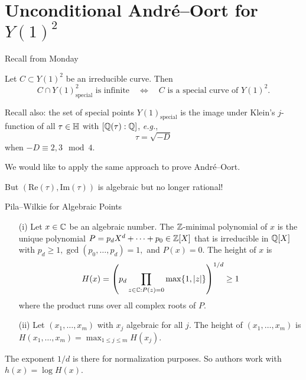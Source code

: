 \documentclass{beamer}
\begin{document}
\section{Unconditional Andr\'e--Oort for $Y(1)^2$}

\begin{frame}{Recall from Monday}
  \begin{theorem}
    Let $C\subset Y(1)^2$ be an irreducible curve. Then
    \begin{equation*}
      C \cap Y(1)^2_{\mathrm{special}}\text{ is
        infinite}\quad\Longleftrightarrow\quad \text{$C$ is a special
        curve of $Y(1)^2$}. 
    \end{equation*}  
  \end{theorem}

  Recall also: the set of special points $Y(1)_{\mathrm{special}}$
  is the image under Klein's $j$-function of all $\tau\in{\mathbb{H}}$ with
  $[{\mathbb{Q}}(\tau):{\mathbb{Q}}]$, \textit{e.g.},
  $$\tau = \sqrt{-D}$$
  when $-D\equiv 2,3 \mod 4$. 
  

  We would like to apply the same approach to prove Andr\'e--Oort.

  But $(\mathrm{Re}(\tau),\mathrm{Im}(\tau))$ is
  algebraic but \alert{no longer} rational!   
\end{frame}

\begin{frame}{Pila--Wilkie for Algebraic Points}
  \begin{definition}
    \begin{enumerate}
    \item [(i)] Let $x\in{\mathbb{C}}$ be an algebraic number. The
      ${\mathbb{Z}}$-minimal polynomial of $x$ is the
      unique polynomial $P=p_dX^d+\cdots+p_0\in {\mathbb{Z}}[X]$ that is
      irreducible in ${\mathbb{Q}}[X]$ with $p_d\ge
      1,
      \gcd(p_0,\ldots,p_d)=1,$ and $P(x)=0$. The \alert{height} of $x$
      is
      \begin{equation*}
        H(x) = \left(p_d \prod_{z\in {\mathbb{C}} : P(z)=0}
          \max\{1,|z|\}\right)^{1/d}\ge 1
      \end{equation*}
      where the product runs over all complex roots of $P$.
    \item[(ii)] Let $(x_1,\ldots,x_m)$ with $x_j$
      algebraic for all $j$. The \alert{height} of
      $(x_1,\ldots,x_m)$ is
      $H(x_1,\ldots,x_m) = \max_{1\le j\le m}H(x_j)$. 
    \end{enumerate}
  \end{definition}
  The exponent $1/d$ is there for normalization purposes. So authors
  work with $h(x)=\log H(x)$. 
\end{frame}
\end{document}
